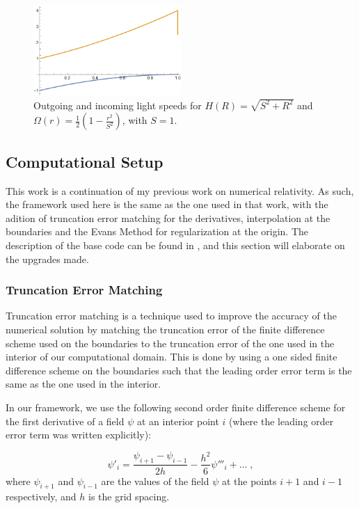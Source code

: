\begin{figure}[h]
    \centering
    \includegraphics[width=0.5\textwidth]{Images/Bad_Speeds.png}
    \caption{Outgoing and incoming light speeds for $H(R) = \sqrt{S^2+R^2}$ and $\Omega(r) = \frac{1}{2} \left(1 - \frac{r^2}{S^2}\right)$, with $S = 1$.}
    \label{fig:Bad_Speeds}
\end{figure}

\subsection{Computational Setup}

This work is a continuation of my previous work on numerical relativity. As such, the framework used here is the same as the one used in that work, with the adition of truncation error matching for the derivatives, interpolation at the boundaries and the Evans Method for regularization at the origin. The description of the base code can be found in \cite{}, and this section will elaborate on the upgrades made.

\subsubsection{Truncation Error Matching}

Truncation error matching is a technique used to improve the accuracy of the numerical solution by matching the truncation error of the finite difference scheme used on the boundaries to the truncation error of the one used in the interior of our computational domain. This is done by using a one sided finite difference scheme on the boundaries such that the leading order error term is the same as the one used in the interior.

In our framework, we use the following second order finite difference scheme for the first derivative of a field $\psi$ at an interior point $i$ (where the leading order error term was written explicitly):

\begin{equation}
    \psi'_i = \frac{\psi_{i+1} - \psi_{i-1}}{2h} - \frac{h^2}{6} \psi'''_i + ...\; ,
\end{equation}
%
where $\psi_{i+1}$ and $\psi_{i-1}$ are the values of the field $\psi$ at the points $i+1$ and $i-1$ respectively, and $h$ is the grid spacing.

